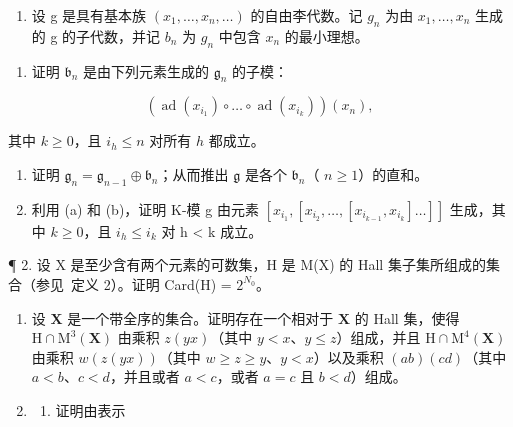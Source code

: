 
\begin{enumerate}
\def\labelenumi{\arabic{enumi}.}
\tightlist
\item
  设 g 是具有基本族 \((x_{1},\ldots,x_{n},\ldots)\) 的自由李代数。记 \(g_{n}\) 为由 \(x_{1},\ldots,x_{n}\) 生成的 g 的子代数，并记 \(b_{n}\) 为 \(g_{n}\) 中包含 \(x_{n}\) 的最小理想。
\end{enumerate}

\begin{enumerate}
\def\labelenumi{(\alph{enumi})}
\tightlist
\item
  证明 \(\mathfrak{b}_n\) 是由下列元素生成的 \(\mathfrak{g}_n\) 的子模：
\end{enumerate}

\[
\left(\operatorname{ad} \left(x _ {i _ {1}}\right) \circ \dots \circ \operatorname{ad} \left(x _ {i _ {k}}\right)\right) \left(x _ {n}\right),
\]

其中 \(k \geqslant 0\)，且 \(i_h \leqslant n\) 对所有 \(h\) 都成立。

\begin{enumerate}
\def\labelenumi{(\alph{enumi})}
\setcounter{enumi}{1}
\item
  证明 \(\mathfrak{g}_n = \mathfrak{g}_{n-1} \oplus \mathfrak{b}_n\)；从而推出 \(\mathfrak{g}\) 是各个 \(\mathfrak{b}_n\)（ \(n \geqslant 1\)）的直和。
\item
  利用 (a) 和 (b)，证明 K-模 g 由元素 \([x_{i_{1}}, [x_{i_{2}}, \ldots, [x_{i_{k-1}}, x_{i_{k}}] \ldots]]\) 生成，其中 \(k \geqslant 0\)，且 \(i_{h} \leqslant i_{k}\) 对 h \textless{} k 成立。
\end{enumerate}

¶ 2. 设 X 是至少含有两个元素的可数集，H 是 M(X) 的 Hall 集子集所组成的集合（参见~定义 2）。证明 Card(H) = \(2^{N_0}\)。

\begin{enumerate}
\def\labelenumi{\arabic{enumi}.}
\setcounter{enumi}{2}
\item
  设 \(\mathbf{X}\) 是一个带全序的集合。证明存在一个相对于 \(\mathbf{X}\) 的 Hall 集，使得 \(\mathrm{H} \cap \mathrm{M}^3(\mathbf{X})\) 由乘积 \(z(yx)\)（其中 \(y < x\)、\(y \leqslant z\)）组成，并且 \(\mathrm{H} \cap \mathrm{M}^4(\mathbf{X})\) 由乘积 \(w(z(yx))\)（其中 \(w \geqslant z \geqslant y\)、\(y < x\)）以及乘积 \((ab)(cd)\)（其中 \(a < b\)、\(c < d\)，并且或者 \(a < c\)，或者 \(a = c\) 且 \(b < d\)）组成。
\item
  \begin{enumerate}
  \def\labelenumii{(\alph{enumii})}
  \tightlist
  \item
    证明由表示
  \end{enumerate}
\end{enumerate}

